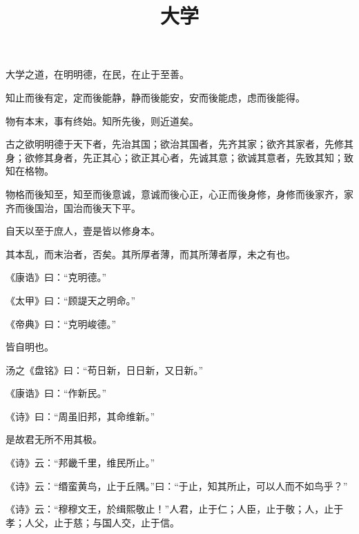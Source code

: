 \documentclass[twoside,openany]{book}
\title{大学}
\author{\xpinyin{曾}{zeng1}\xpinyin{参}{shen1}}
\date{}
\begin{document}
\maketitle
	
\noindent
	
	
\begin{pinyinscope}
大学之道，在明明德，在民，在止于至善。

知止而後有定，定而後能静，静而後能安，安而後能虑，虑而後能得。

物有本末，事有终始。知所先後，则近道矣。

古之欲明明德于天下者，先治其国；欲治其国者，先齐其家；欲齐其家者，先修其身；欲修其身者，先正其心；欲正其心者，先诚其意；欲诚其意者，先致其知；致知在格物。

物格而後知至，知至而後意诚，意诚而後心正，心正而後身修，身修而後家齐，家齐而後国治，国治而後天下平。

自天以至于庶人，壹是皆以修身本。

其本乱，而末治者，否矣。其所厚者薄，而其所薄者厚，未之有也。

《康诰》曰：“克明德。”

《太甲》曰：“顾諟天之明命。”

《帝典》曰：“克明峻德。”

皆自明也。

汤之《盘铭》曰：“苟日新，日日新，又日新。”

《康诰》曰：“作新民。”

《诗》曰：“周虽旧邦，其命维新。”

是故君无所不用其极。

《诗》云：“邦畿千里，维民所止。”

《诗》云：“缗蛮黄鸟，止于丘隅。”曰：“于止，知其所止，可以人而不如鸟乎？”

《诗》云：“穆穆文王，於缉熙敬止！”人君，止于仁；人臣，止于敬；人，止于孝；人父，止于慈；与国人交，止于信。


\end{pinyinscope}
\end{document}
